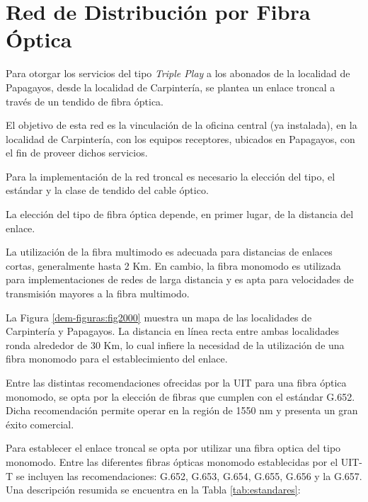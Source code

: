\section{Red de Distribución por Fibra Óptica}


Para otorgar los servicios del tipo \textit{Triple Play} a los abonados de la localidad de Papagayos, desde la localidad de Carpintería, se plantea un enlace troncal a través de un tendido de fibra óptica.

El objetivo de esta red es la vinculación de la oficina central (ya instalada), en la localidad de Carpintería, con los equipos receptores, ubicados en Papagayos, con el fin de  proveer dichos servicios.


Para la implementación de la red troncal es necesario la elección del tipo, el estándar y la clase de tendido del cable óptico.


La elección del tipo de fibra óptica depende, en primer lugar, de la distancia del enlace.


La utilización de la fibra multimodo es adecuada para distancias de enlaces cortas, generalmente hasta 2 Km.
En cambio, la fibra monomodo es utilizada para implementaciones de redes de larga distancia y es apta para velocidades de transmisión mayores a la fibra multimodo.


La Figura \ref{dem-figuras:fig2000} muestra un mapa de las localidades de Carpintería y Papagayos. La distancia en línea recta  entre ambas localidades ronda alrededor de 30 Km, lo cual infiere la necesidad de la utilización de una fibra monomodo para el establecimiento del enlace.







Entre las distintas recomendaciones ofrecidas por la UIT para una fibra óptica monomodo, se opta por la elección de fibras que cumplen con el estándar G.652. Dicha recomendación permite operar en la región de 1550 nm y presenta un gran éxito comercial.


Para establecer el enlace troncal se opta por utilizar una fibra optica del tipo monomodo. Entre las diferentes fibras ópticas monomodo establecidas por el UIT-T se incluyen las recomendaciones: G.652, G.653, G.654, G.655, G.656 y la G.657. Una descripción resumida se encuentra en la Tabla \ref{tab:estandares}: 

